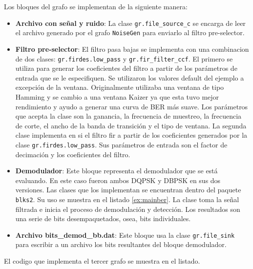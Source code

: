 Los bloques del grafo se implementan de la siguiente manera:

\begin{itemize}
  \item \textbf{Archivo con se\~nal y ruido}: La clase \verb|gr.file_source_c| se encarga de leer el
  archivo generado por el grafo \verb|NoiseGen| para enviarlo al filtro pre-selector.
  \item \textbf{Filtro pre-selector}: El filtro pasa bajas se implementa con una combinacion de dos
  clases: \verb|gr.firdes.low_pass| y \verb|gr.fir_filter_ccf|. El primero se utiliza para generar
  los coeficientes del filtro a partir de los par\'ametros de entrada que se le especifiquen. Se
  utilizaron los valores default del ejemplo a excepci\'on de la ventana. Originalmente utilizaba
  una ventana de tipo Hamming y se cambio a una ventana Kaizer ya que esta tuvo mejor rendimiento y
  ayudo a generar una curva de BER m\'as suave. Los par\'ametros que acepta la clase son la
  ganancia, la frecuencia de muestreo, la frecuencia de corte, el ancho de la banda de transici\'on
  y el tipo de ventana. La segunda clase implementa en si el filtro fir a partir de los coeficientes
  generados por la clase \verb|gr.firdes.low_pass|. Sus par\'ametros de entrada son el factor de
  decimaci\'on y los coeficientes del filtro.
  \item \textbf{Demodulador}: Este bloque representa el demodulador que se est\'a evaluando. En este
  caso fueron ambos DQPSK y DBPSK en sus dos versiones. Las clases que los implementan se encuentran
  dentro del paquete \verb|blks2|. Su uso se muestra en el listado \ref{ex:mainber}. La clase toma
  la se\~nal filtrada e inicia el proceso de demodulaci\'on y detecci\'on. Los resultados son una serie de bits
  desempaquetados, osea, bits individuales.
  \item \textbf{Archivo bits\_demod\_bb.dat}: Este bloque usa la clase \verb|gr.file_sink| para
  escribir a un archivo los bits resultantes del bloque demodulador.
\end{itemize}

El codigo que implementa el tercer grafo se muestra en el listado.

